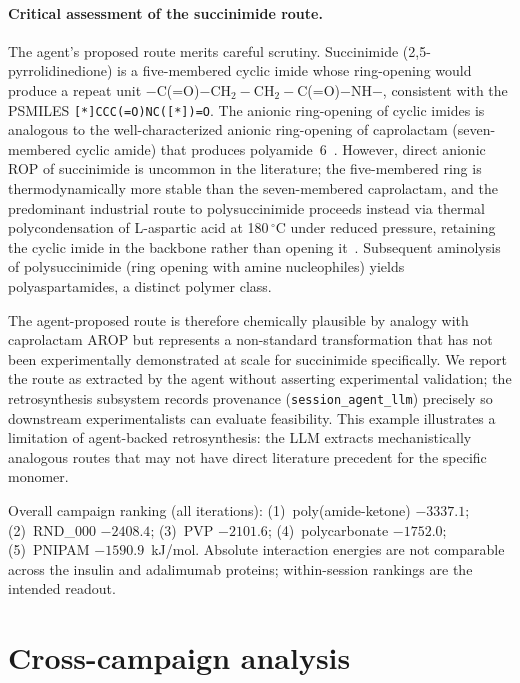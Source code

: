 \documentclass[twocolumn]{fairmeta}
\begin{document}
\paragraph{Critical assessment of the succinimide route.}
The agent's proposed route merits careful scrutiny.
Succinimide (2,5-pyrrolidinedione) is a five-membered cyclic imide whose ring-opening would produce a repeat unit $-$C(=O)$-$CH$_2-$CH$_2-$C(=O)$-$NH$-$, consistent with the PSMILES \texttt{[*]CCC(=O)NC([*])=O}.
The anionic ring-opening of cyclic imides is analogous to the well-characterized anionic ring-opening of caprolactam (seven-membered cyclic amide) that produces polyamide~6~\cite{neuse2008polyaspartamides}.
However, direct anionic ROP of succinimide is uncommon in the literature; the five-membered ring is thermodynamically more stable than the seven-membered caprolactam, and the predominant industrial route to polysuccinimide proceeds instead via thermal polycondensation of L-aspartic acid at 180\,$^\circ$C under reduced pressure, retaining the cyclic imide in the backbone rather than opening it~\cite{neuse2008polyaspartamides}.
Subsequent aminolysis of polysuccinimide (ring opening with amine nucleophiles) yields polyaspartamides, a distinct polymer class.

The agent-proposed route is therefore chemically plausible by analogy with caprolactam AROP but represents a non-standard transformation that has not been experimentally demonstrated at scale for succinimide specifically.
We report the route as extracted by the agent without asserting experimental validation; the retrosynthesis subsystem records provenance (\texttt{session\_agent\_llm}) precisely so downstream experimentalists can evaluate feasibility.
This example illustrates a limitation of agent-backed retrosynthesis: the LLM extracts mechanistically analogous routes that may not have direct literature precedent for the specific monomer.

Overall campaign ranking (all iterations): (1)~poly(amide-ketone) $-3337.1$; (2)~RND\_000 $-2408.4$; (3)~PVP $-2101.6$; (4)~polycarbonate $-1752.0$; (5)~PNIPAM $-1590.9$~kJ/mol.
Absolute interaction energies are not comparable across the insulin and adalimumab proteins; within-session rankings are the intended readout.

\section{Cross-campaign analysis}
\label{sec:cross}
\end{document}
